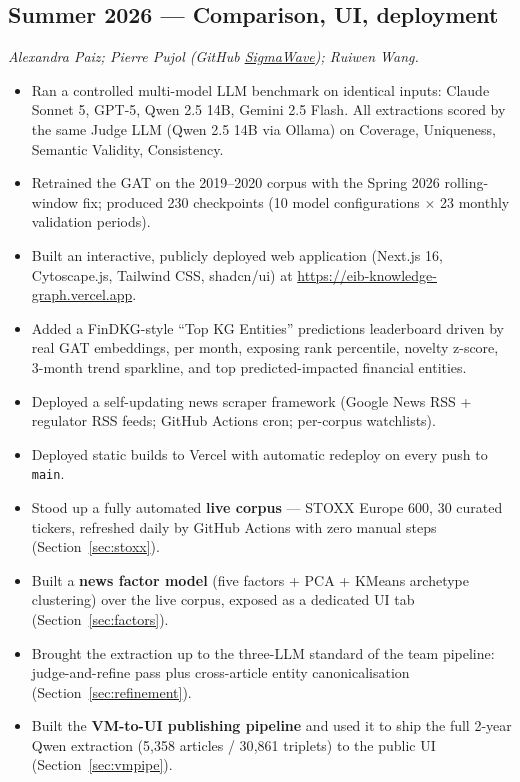 \documentclass[11pt]{article}
\begin{document}
\subsection{Summer 2026 --- Comparison, UI, deployment}
\emph{Alexandra Paiz; Pierre Pujol (GitHub \href{https://github.com/SigmaWave}{SigmaWave}); Ruiwen Wang.}

\begin{itemize}
  \item Ran a controlled multi-model LLM benchmark on identical inputs: Claude Sonnet 5, GPT-5, Qwen 2.5 14B, Gemini 2.5 Flash. All extractions scored by the same Judge LLM (Qwen 2.5 14B via Ollama) on Coverage, Uniqueness, Semantic Validity, Consistency.
  \item Retrained the GAT on the 2019--2020 corpus with the Spring 2026 rolling-window fix; produced 230 checkpoints (10 model configurations \(\times\) 23 monthly validation periods).
  \item Built an interactive, publicly deployed web application (Next.js 16, Cytoscape.js, Tailwind CSS, shadcn/ui) at \url{https://eib-knowledge-graph.vercel.app}.
  \item Added a FinDKG-style ``Top KG Entities'' predictions leaderboard driven by real GAT embeddings, per month, exposing rank percentile, novelty z-score, 3-month trend sparkline, and top predicted-impacted financial entities.
  \item Deployed a self-updating news scraper framework (Google News RSS + regulator RSS feeds; GitHub Actions cron; per-corpus watchlists).
  \item Deployed static builds to Vercel with automatic redeploy on every push to \texttt{main}.
  \item Stood up a fully automated \textbf{live corpus} --- STOXX Europe 600, 30 curated tickers, refreshed daily by GitHub Actions with zero manual steps (Section~\ref{sec:stoxx}).
  \item Built a \textbf{news factor model} (five factors + PCA + KMeans archetype clustering) over the live corpus, exposed as a dedicated UI tab (Section~\ref{sec:factors}).
  \item Brought the extraction up to the three-LLM standard of the team pipeline: judge-and-refine pass plus cross-article entity canonicalisation (Section~\ref{sec:refinement}).
  \item Built the \textbf{VM-to-UI publishing pipeline} and used it to ship the full 2-year Qwen extraction (5{,}358 articles / 30{,}861 triplets) to the public UI (Section~\ref{sec:vmpipe}).

\end{itemize}
\end{document}
